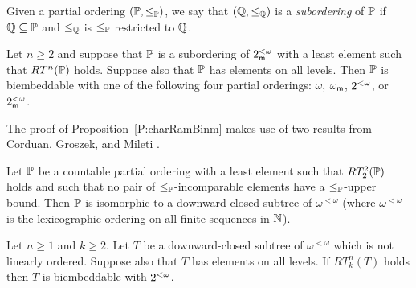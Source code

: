 \begin{definition}
Given a partial ordering $(\mathbb{P},\leq_{\mathbb{P}})$,
we say that $(\mathbb{Q},\leq_{\mathbb{Q}})$ is a \textit{subordering} of $\mathbb{P}$ if
$\mathbb{Q}\subseteq\mathbb{P}$ and $\leq_{\mathbb{Q}}$ is $\leq_{\mathbb{P}}$ restricted to $\mathbb{Q}$.
\end{definition}

\begin{prop}[\RCAo]\label{P:charRamBinm}
Let $n\geq 2$ and suppose that $\mathbb{P}$ is a subordering of $2^{<\omega}_{\mathsf{m}}$
with a least element such that $RT^n(\mathbb{P})$ holds.
Suppose also that $\mathbb{P}$ has elements on all levels.
Then $\mathbb{P}$ is biembeddable with one of the following four partial orderings:
$\omega$, $\omega_\mathsf{m}$, $2^{<\omega}$, or $2^{<\omega}_{\mathsf{m}}$.
\end{prop}

The proof of Proposition~\ref{P:charRamBinm} makes use of two results
from Corduan, Groszek, and Mileti \cite{CGM}.
\begin{prop}\label{P:CGM1}
Let $\mathbb{P}$ be a countable partial ordering with a least element such that
$RT^2_2(\mathbb{P})$ holds and such that no pair of $\leq_{\mathbb{P}}$-incomparable elements
have a $\leq_{\mathbb{P}}$-upper bound.
Then $\mathbb{P}$ is isomorphic to a downward-closed subtree of $\omega^{<\omega}$
(where $\omega^{<\omega}$ is the lexicographic ordering on all finite sequences in $\mathbb{N}$).
\end{prop}

\begin{prop}\label{P:CGM2}
Let $n\geq 1$ and $k\geq 2$.
Let $T$ be a downward-closed subtree of $\omega^{<\omega}$
which is not linearly ordered.
Suppose also that $T$ has elements on all levels.
If $RT^n_k(T)$ holds then $T$ is biembeddable with $2^{<\omega}$.
\end{prop}


